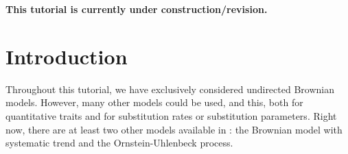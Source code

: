 \bigskip
\begin{center}
\textbf{\Large \color{red}This tutorial is currently under construction/revision.}
\end{center}
\bigskip

\section{Introduction}

Throughout this tutorial, we have exclusively considered undirected Brownian models.
However, many other models could be used, and this, both for quantitative traits and for substitution rates or substitution parameters.
Right now, there are at least two other models available in \RevBayes:
the Brownian model with systematic trend and the Ornstein-Uhlenbeck process.


%
%



